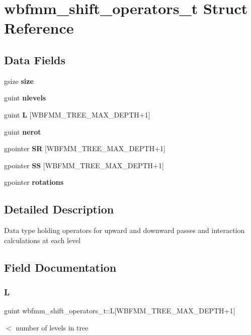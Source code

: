 \section{wbfmm\+\_\+shift\+\_\+operators\+\_\+t Struct Reference}
\label{structwbfmm__shift__operators__t}
\subsection*{Data Fields}
\begin{DoxyCompactItemize}
\item 
gsize \textbf{ size}
\item 
guint \textbf{ nlevels}
\item 
guint \textbf{ L} [W\+B\+F\+M\+M\+\_\+\+T\+R\+E\+E\+\_\+\+M\+A\+X\+\_\+\+D\+E\+P\+TH+1]
\item 
guint \textbf{ nerot}
\item 
gpointer \textbf{ SR} [W\+B\+F\+M\+M\+\_\+\+T\+R\+E\+E\+\_\+\+M\+A\+X\+\_\+\+D\+E\+P\+TH+1]
\item 
gpointer \textbf{ SS} [W\+B\+F\+M\+M\+\_\+\+T\+R\+E\+E\+\_\+\+M\+A\+X\+\_\+\+D\+E\+P\+TH+1]
\item 
gpointer \textbf{ rotations}
\end{DoxyCompactItemize}


\subsection{Detailed Description}
Data type holding operators for upward and downward passes and interaction calculations at each level 

\subsection{Field Documentation}
\mbox{\label{structwbfmm__shift__operators__t_a4cae6342c4c5a47c1c392f24e0650aaa}} 
\subsubsection{L}
{\footnotesize\ttfamily guint wbfmm\+\_\+shift\+\_\+operators\+\_\+t\+::L[W\+B\+F\+M\+M\+\_\+\+T\+R\+E\+E\+\_\+\+M\+A\+X\+\_\+\+D\+E\+P\+TH+1]}

$<$ number of levels in tree \mbox{\label{structwbfmm__shift__operators__t_abba07e5cbe6a970754a7074b48c7fac6}} 
